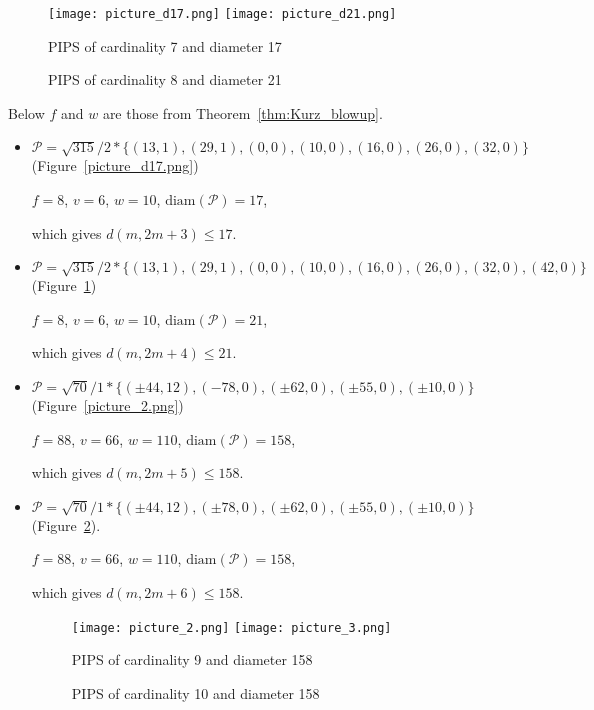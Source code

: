 \documentclass[12pt]{article}
\theoremstyle{theorem}
\theoremstyle{dfn}
\theoremstyle{remark}
\begin{document}
\begin{figure}[htbp]
	\texttt{[image: picture\_d17.png]}
	\hfill
	\texttt{[image: picture\_d21.png]}
	\\
	\parbox{.48\linewidth}{\caption{PIPS of cardinality 7 and diameter 17}
	\label{picture_d17.png}}
	\hfill
	\parbox{.48\linewidth}{\caption{PIPS of cardinality 8 and diameter 21}
	\label{picture_d21.png}}
\end{figure}

Below $f$ and $w$ are those from Theorem~\ref{thm:Kurz_blowup}.

\begin{itemize}
\setlength{\itemsep}{-1mm}

\item
$\mathcal{P}=\sqrt{315}/{2} * \{ (13, 1),
(29, 1),
(0, 0),
(10, 0),
(16, 0),
(26, 0),
(32, 0)\}
$
(Figure~\ref{picture_d17.png})

$f = 8$, $v = 6$, $w = 10$, $\operatorname{diam(\mathcal{P})} = 17$,

which gives $d(m, 2m + 3) \leq 17$.


\item
$\mathcal{P}=\sqrt{315}/{2} * \{ (13, 1),
(29, 1),
(0, 0),
(10, 0),
(16, 0),
(26, 0),
(32, 0),
(42, 0)\}
$
(Figure~\ref{picture_d21.png})

$f = 8$, $v = 6$, $w = 10$, $\operatorname{diam(\mathcal{P})} = 21$,

which gives $d(m, 2m + 4) \leq 21$.


\item
$\mathcal{P}=\sqrt{70}/{1} * \{ (\pm 44, 12),
(-78 , 0),
(\pm 62, 0),
(\pm 55 , 0),
(\pm 10 , 0)\}
$
(Figure~\ref{picture_2.png})

$f = 88$, $v = 66$, $w = 110$, $\operatorname{diam(\mathcal{P})} = 158$,

which gives $d(m, 2m + 5) \leq 158$.


\item
$\mathcal{P}=\sqrt{70}/{1} * \{ (\pm 44, 12),
(\pm 78 , 0),
(\pm 62, 0),
(\pm 55 , 0),
(\pm 10 , 0)\}
$
(Figure~\ref{picture_3.png}).

$f = 88$, $v = 66$, $w = 110$, $\operatorname{diam(\mathcal{P})} = 158$,

which gives $d(m, 2m + 6) \leq 158$.


\begin{figure}[h!]
	\texttt{[image: picture\_2.png]}
	\hfill
	\texttt{[image: picture\_3.png]}
	\\
	\parbox{.48\linewidth}{\caption{PIPS of cardinality 9 and diameter 158}
	\label{picture_2.png}}
	\hfill
	\parbox{.48\linewidth}{\caption{PIPS of cardinality 10 and diameter 158}
	\label{picture_3.png}}
\end{figure}



\end{itemize}
\end{document}
